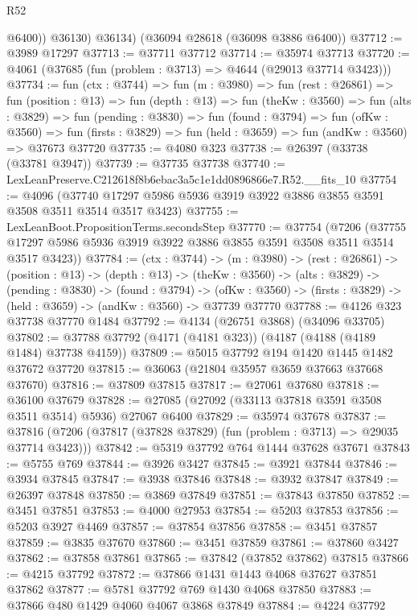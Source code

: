 \begin{lexlean}{R52}
\begin{coremodule}
            @6400))
        @36130)
      @36134)
    (@36094 @28618 (@36098 @3886 @6400))
@37712 := @3989 @17297
@37713 := @37711 @37712
@37714 := @35974 @37713
@37720 := @4061 (@37685 (fun (problem : @3713) => @4644 (@29013 @37714 @3423)))
@37734 := fun (ctx : @3744) =>
  fun (m : @3980) =>
  fun (rest : @26861) =>
  fun (position : @13) =>
  fun (depth : @13) =>
  fun (theKw : @3560) =>
  fun (alts : @3829) =>
  fun (pending : @3830) =>
  fun (found : @3794) =>
  fun (ofKw : @3560) =>
  fun (firsts : @3829) => fun (held : @3659) => fun (andKw : @3560) => @37673 @37720
@37735 := @4080 @323
@37738 := @26397 (@33738 (@33781 @3947))
@37739 := @37735 @37738
@37740 := LexLeanPreserve.C212618f8b6ebac3a5c1e1dd0896866e7.R52.__fits_10
@37754 := @4096
    (@37740 @17297 @5986 @5936 @3919 @3922 @3886 @3855 @3591 @3508 @3511 @3514 @3517 @3423)
@37755 := LexLeanBoot.PropositionTerms.secondsStep
@37770 := @37754
    (@7206 (@37755 @17297 @5986 @5936 @3919 @3922 @3886 @3855 @3591 @3508 @3511 @3514 @3517 @3423))
@37784 := (ctx : @3744) ->
  (m : @3980) ->
  (rest : @26861) ->
  (position : @13) ->
  (depth : @13) ->
  (theKw : @3560) ->
  (alts : @3829) ->
  (pending : @3830) ->
  (found : @3794) ->
  (ofKw : @3560) -> (firsts : @3829) -> (held : @3659) -> (andKw : @3560) -> @37739 @37770
@37788 := @4126 @323 @37738 @37770 @1484
@37792 := @4134 (@26751 @3868) (@34096 @33705)
@37802 := @37788 @37792 (@4171 (@4181 @323)) (@4187 (@4188 (@4189 @1484) @37738 @4159))
@37809 := @5015 @37792 @194 @1420 @1445 @1482 @37672 @37720
@37815 := @36063 (@21804 @35957 @3659 @37663 @37668 @37670)
@37816 := @37809 @37815
@37817 := @27061 @37680
@37818 := @36100 @37679
@37828 := @27085 (@27092 (@33113 @37818 @3591 @3508 @3511 @3514) @5936) @27067 @6400
@37829 := @35974 @37678
@37837 := @37816 (@7206 (@37817 (@37828 @37829) (fun (problem : @3713) => @29035 @37714 @3423)))
@37842 := @5319 @37792 @764 @1444 @37628 @37671
@37843 := @5755 @769
@37844 := @3926 @3427
@37845 := @3921 @37844
@37846 := @3934 @37845
@37847 := @3938 @37846
@37848 := @3932 @37847
@37849 := @26397 @37848
@37850 := @3869 @37849
@37851 := @37843 @37850
@37852 := @3451 @37851
@37853 := @4000 @27953
@37854 := @5203 @37853
@37856 := @5203 @3927 @4469
@37857 := @37854 @37856
@37858 := @3451 @37857
@37859 := @3835 @37670
@37860 := @3451 @37859
@37861 := @37860 @3427
@37862 := @37858 @37861
@37865 := @37842 (@37852 @37862) @37815
@37866 := @4215 @37792
@37872 := @37866 @1431 @1443 @4068 @37627 @37851 @37862
@37877 := @5781 @37792 @769 @1430 @4068 @37850
@37883 := @37866 @480 @1429 @4060 @4067 @3868 @37849
@37884 := @4224 @37792

\end{coremodule}
\end{lexlean}
